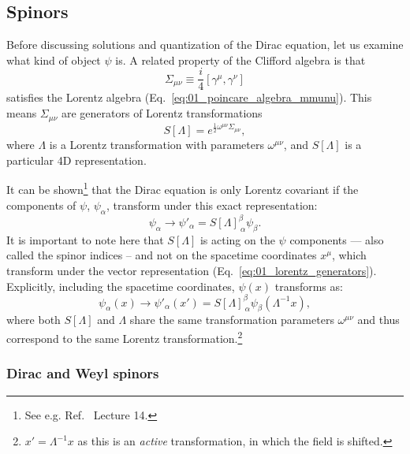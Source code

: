 \subsection{Spinors}
\label{sec:01_qft_spinors_spinors}

Before discussing solutions and quantization of the Dirac equation, let us examine what kind of object $\psi$ is.
A related property of the Clifford algebra is that
\begin{equation}
	\label{eq:01_qft_spinors_gamma_lorentz_generators}
	\Sigma_{\mu\nu} \equiv \frac{i}{4}[\gamma^\mu, \gamma^\nu]
\end{equation}
satisfies the Lorentz algebra (Eq.~\ref{eq:01_poincare_algebra_mmunu}).
This means $\Sigma_{\mu\nu}$ are generators of Lorentz transformations
\begin{equation}
	\label{eq:01_qft_spinors_spinor_lorentz_transformation}
	S[\Lambda] = e^{\frac{1}{2}\omega^{\mu\nu}\Sigma_{\mu\nu}},
\end{equation}
where $\Lambda$ is a Lorentz transformation with parameters $\omega^{\mu\nu}$, and $S[\Lambda]$ is a particular 4D representation.

It can be shown\footnote{See e.g. Ref.~\cite{LiuRQFT} Lecture 14.} that the Dirac equation is only Lorentz covariant if the components of $\psi$, $\psi_\alpha$, transform under this exact representation:
\begin{equation}
	\label{eq:01_qft_spinors_spinor_transformation}
	\psi_\alpha \rightarrow \psi'_\alpha = S[\Lambda]^\beta_{\ \alpha} \psi_\beta.
\end{equation}
It is important to note here that $S[\Lambda]$ is acting on the $\psi$ components --- also called the spinor indices -- and not on the spacetime coordinates $x^\mu$, which transform under the vector representation (Eq.~\ref{eq:01_lorentz_generators}).
Explicitly, including the spacetime coordinates, $\psi(x)$ transforms as:
\begin{equation}
	\label{eq:01_qft_spinors_spinor_transformation_x}
	\psi_\alpha(x) \rightarrow \psi'_\alpha(x') = S[\Lambda]^\beta_{\ \alpha} \psi_\beta(\Lambda^{-1}x),
\end{equation}
where both $S[\Lambda]$ and $\Lambda$ share the same transformation parameters $\omega^{\mu\nu}$ and thus correspond to the same Lorentz transformation.\footnote{$x' = \Lambda^{-1}x$ as this is an \textit{active} transformation, in which the field is shifted.}

\subsubsection{Dirac and Weyl spinors}

